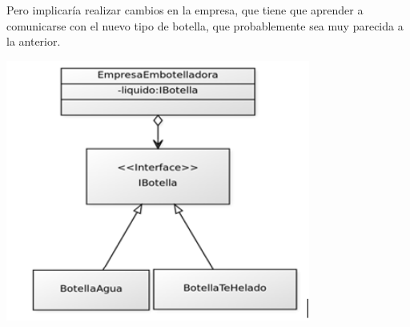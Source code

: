 \documentclass[11pt,letterpaper]{article}
\begin{document}
Pero implicaría realizar cambios en la empresa, que tiene que aprender a comunicarse con el nuevo tipo de botella, que probablemente sea muy parecida a la anterior.
\begin{center}
	\includegraphics[width=10cm]{./imagenes/5.png} 
\end{center}
\end{document}
